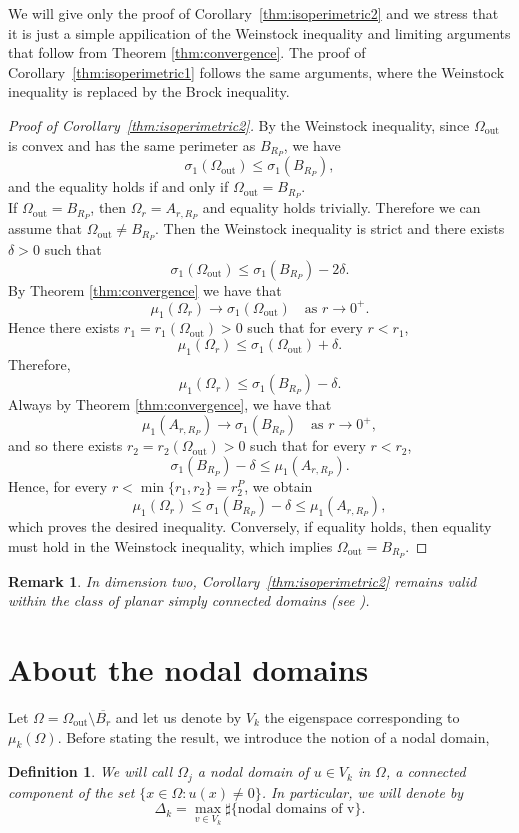 \documentclass[12pt,reqno]{amsart}
\newtheorem{definition}{Definition}[section]
\newtheorem{remark}{Remark}[section]
\numberwithin{equation}{section}
\numberwithin{theorem}{section}
\numberwithin{equation}{section}
\numberwithin{theorem}{section}
\begin{document}
We will give only the proof of Corollary~\ref{thm:isoperimetric2} and we stress that it is just a simple appilication of the Weinstock inequality and limiting arguments that follow from Theorem \ref{thm:convergence}. The proof of Corollary~\ref{thm:isoperimetric1} follows the same arguments, where the Weinstock inequality is replaced by the Brock inequality.


\begin{proof}[Proof of Corollary~\ref{thm:isoperimetric2}]
By the Weinstock inequality, since $\Omega_{\mathrm{out}}$ is convex and has the same perimeter as $B_{R_P}$, we have
\[
\sigma_1(\Omega_{\mathrm{out}}) \le \sigma_1(B_{R_P}),
\]
and the equality holds if and only if $\Omega_{\mathrm{out}} = B_{R_P}$.\\
If $\Omega_{\mathrm{out}} = B_{R_P}$, then $\Omega_r = A_{r,R_P}$ and equality holds trivially. Therefore we can assume that $\Omega_{\mathrm{out}} \neq B_{R_P}$. Then the Weinstock inequality is strict and there exists $\delta > 0$ such that
\[
\sigma_1(\Omega_{\mathrm{out}}) \le \sigma_1(B_{R_P}) - 2\delta.
\]
By Theorem \ref{thm:convergence} we have that
\[
\mu_1(\Omega_r) \to \sigma_1(\Omega_{\mathrm{out}}) \quad \text{as } r \to 0^+.
\]
Hence there exists $r_1=r_1(\Omega_{\mathrm{out}}) > 0$ such that for every $r < r_1$,
\[
\mu_1(\Omega_r) \le \sigma_1(\Omega_{\mathrm{out}}) + \delta.
\]
Therefore,
\[
\mu_1(\Omega_r) \le \sigma_1(B_{R_P}) - \delta.
\]
Always by Theorem \ref{thm:convergence}, we have that
\[
\mu_1(A_{r,R_P}) \to \sigma_1(B_{R_P}) \quad \text{as } r \to 0^+,
\]
and so there exists $r_2=r_2(\Omega_\mathrm{out}) > 0$ such that for every $r < r_2$,
\[
\sigma_1(B_{R_P}) - \delta\le \mu_1(A_{r,R_P})  .
\]
Hence, for every $r < \min\{r_1,r_2\}=r^P_2$, we obtain
\[
\mu_1(\Omega_r) \le \sigma_1(B_{R_P}) - \delta 
\le \mu_1(A_{r,R_P}),
\]
which proves the desired inequality.
Conversely, if equality holds, then equality must hold in the Weinstock inequality, which implies $\Omega_{\mathrm{out}} = B_{R_P}$.
\end{proof}

\begin{remark}
In dimension two, Corollary~\ref{thm:isoperimetric2} remains valid within
the class of planar simply connected domains (see \cite{Wein1954}).
\end{remark}

\section{About the nodal domains}\label{sec:6}
Let $\Omega= \Omega_\mathrm{out}\setminus\overline{B_r}$  and let us denote by $V_k$ the eigenspace corresponding to $\mu_k(\Omega)$. Before stating the result, we introduce the notion of a nodal domain,
\begin{definition}
    We will call $\Omega_j$ a nodal domain of $u\in V_k$ in $\Omega$, a connected component of the set $\{x\in \Omega: u(x)\neq 0\}$. In particular, we will denote by
    \begin{equation}
        \Delta_k = \max_{v \in V_k} \sharp \{\text{nodal domains of v} \}.
    \end{equation}
\end{definition} 
\end{document}
